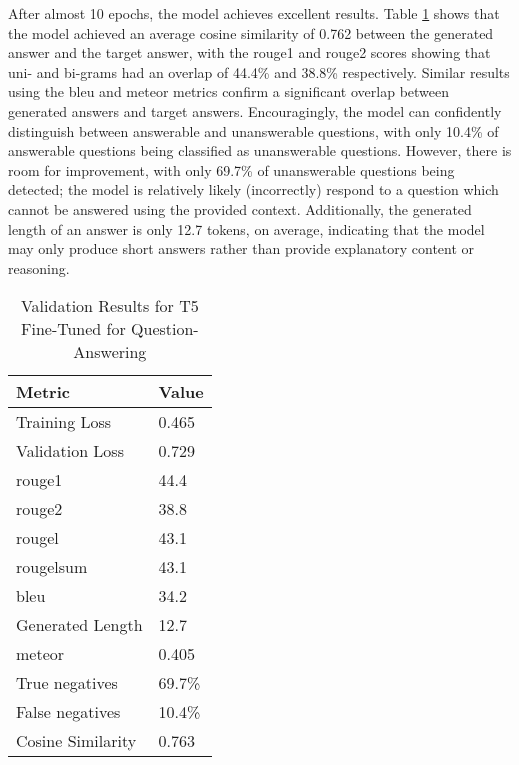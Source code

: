 After almost 10 epochs, the model achieves excellent results. Table \ref{tab:results_t5} shows that the model achieved an average cosine similarity of 0.762 between the generated answer and the target answer, with the \acrshort{rouge}1 and \acrshort{rouge}2 scores showing that uni- and bi-grams had an overlap of 44.4\% and 38.8\% respectively. Similar results using the \acrshort{bleu} and \acrshort{meteor} metrics confirm a significant overlap between generated answers and target answers. Encouragingly, the model can confidently distinguish between answerable and unanswerable questions, with only 10.4\% of answerable questions being classified as unanswerable questions. However, there is room for improvement, with only 69.7\% of unanswerable questions being detected; the model is relatively likely (incorrectly) respond to a question which cannot be answered using the provided context. Additionally, the generated length of an answer is only 12.7 tokens, on average, indicating that the model may only produce short answers rather than provide explanatory content or reasoning. 

\begin{table}[ht!]
    \centering
    \begin{tabular}{l|l}
        \textbf{Metric} & \textbf{Value} \\ \hline
        Training Loss & 0.465 \\ \hline
        Validation Loss & 0.729 \\ \hline
        \acrshort{rouge}1 & 44.4 \\ \hline
        \acrshort{rouge}2 & 38.8 \\ \hline
        \acrshort{rouge}l & 43.1 \\ \hline
        \acrshort{rouge}lsum & 43.1 \\ \hline
        \acrshort{bleu} & 34.2 \\ \hline
        Generated Length & 12.7 \\ \hline
        \acrshort{meteor} & 0.405 \\ \hline
        True negatives & 69.7\% \\ \hline
        False negatives & 10.4\% \\ \hline
        Cosine Similarity & 0.763 \\
    \end{tabular}
    \caption{Validation Results for T5 Fine-Tuned for Question-Answering}
    \label{tab:results_t5}
\end{table}

